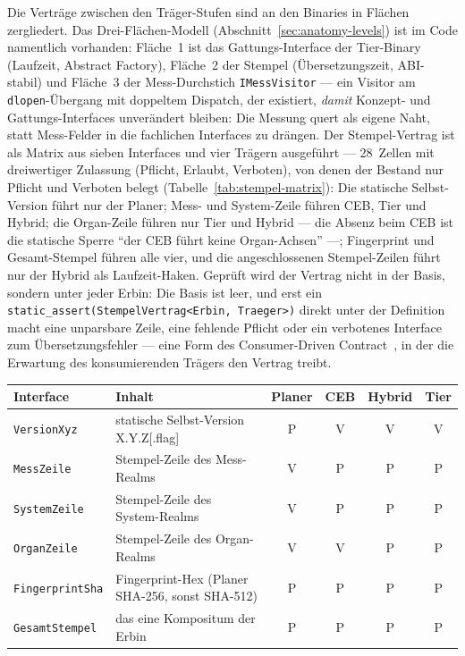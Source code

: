 \begin{nurlang}
Die Verträge zwischen den Träger-Stufen sind an den Binaries in Flächen zergliedert. Das
Drei-Flächen-Modell (Abschnitt~\ref{sec:anatomy-levels}) ist im Code namentlich vorhanden: Fläche~1 ist
das Gattungs-Interface der Tier-Binary (Laufzeit, Abstract Factory), Fläche~2 der Stempel (Übersetzungszeit,
ABI-stabil) und Fläche~3 der Mess-Durchstich \texttt{IMessVisitor} --- ein Visitor am
\texttt{dlopen}-Übergang mit doppeltem Dispatch, der existiert, \emph{damit} Konzept- und Gattungs-Interfaces
unverändert bleiben: Die Messung quert als eigene Naht, statt Mess-Felder in die fachlichen Interfaces zu
drängen. Der Stempel-Vertrag ist als Matrix aus sieben Interfaces und vier Trägern ausgeführt --- 28~Zellen
mit dreiwertiger Zulassung (Pflicht, Erlaubt, Verboten), von denen der Bestand nur Pflicht und Verboten
belegt (Tabelle~\ref{tab:stempel-matrix}): Die statische Selbst-Version führt nur der Planer; Mess- und
System-Zeile führen CEB, Tier und Hybrid; die Organ-Zeile führen nur Tier und Hybrid --- die Absenz beim
CEB ist die statische Sperre \enquote{der CEB führt keine Organ-Achsen} ---; Fingerprint und
Gesamt-Stempel führen alle vier, und die angeschlossenen Stempel-Zeilen führt nur der Hybrid als
Laufzeit-Haken. Geprüft wird der Vertrag nicht in der Basis, sondern unter jeder Erbin: Die Basis ist
leer, und erst ein \texttt{static\_assert(StempelVertrag<Erbin, Traeger>)} direkt unter der Definition
macht eine unparsbare Zeile, eine fehlende Pflicht oder ein verbotenes Interface zum Übersetzungsfehler
--- eine Form des Consumer-Driven Contract~\cite{robinson2006cdc}, in der die Erwartung des konsumierenden
Trägers den Vertrag treibt.
\begin{table}[htbp]\centering\footnotesize
\begin{tabular}{@{}llcccc@{}}
\toprule
Interface & Inhalt & Planer & CEB & Hybrid & Tier \\
\midrule
\texttt{VersionXyz}     & statische Selbst-Version X.Y.Z[.flag]            & P & V & V & V \\
\texttt{MessZeile}      & Stempel-Zeile des Mess-Realms                     & V & P & P & P \\
\texttt{SystemZeile}    & Stempel-Zeile des System-Realms                   & V & P & P & P \\
\texttt{OrganZeile}     & Stempel-Zeile des Organ-Realms                    & V & V & P & P \\
\texttt{FingerprintSha} & Fingerprint-Hex (Planer SHA-256, sonst SHA-512)   & P & P & P & P \\
\texttt{GesamtStempel}  & das eine Kompositum der Erbin                     & P & P & P & P \\

\end{tabular}
\end{table}
\end{nurlang}
